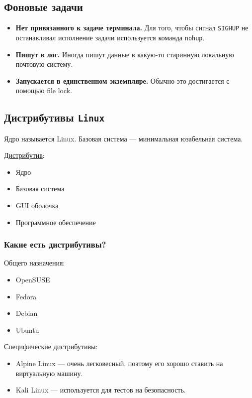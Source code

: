 \subsection{Фоновые задачи}

\begin{itemize}
	\item \textbf{Нет привязанного к задаче терминала.} Для того, чтобы сигнал \texttt{SIGHUP}
	не останавливал исполнение задачи используется команда \texttt{nohup}.
	\item \textbf{Пишут в лог.} Иногда пишут данные в какую-то старинную 
	локальную почтовую систему.
	\item \textbf{Запускается в единственном экземпляре.} Обычно это достигается
	с помощью file lock.
\end{itemize}

\subsection{Дистрибутивы \texttt{Linux}}

Ядро называется Linux. Базовая система --- минимальная юзабельная система.

\underline{Дистрибутив}:
\begin{itemize}
	\item Ядро
	\item Базовая система
	\item GUI оболочка
	\item Программное обеспечение 
\end{itemize}

\subsubsection{Какие есть дистрибутивы?} 

Общего назначения:
\begin{itemize}
	\item OpenSUSE
	\item Fedora
	\item Debian
	\item Ubuntu
\end{itemize}

Специфические дистрибутивы:
\begin{itemize}
	\item Alpine Linux --- очень легковесный, поэтому его
	хорошо ставить на виртуальную машину.
	\item Kali Linux --- используется для тестов на безопасность.
\end{itemize}

